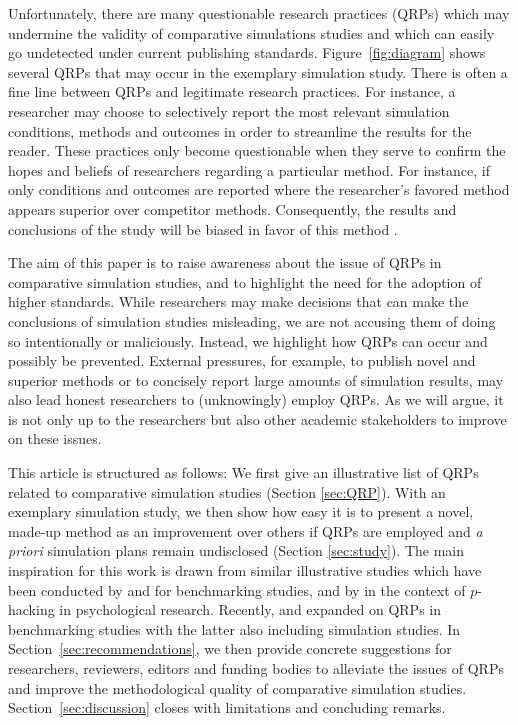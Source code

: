 \documentclass[a4paper, 11pt]{article}
\newcommand{\eg}{{e.g.},~}
\begin{document}
Unfortunately, there are many questionable research practices (QRPs) which may
undermine the validity of comparative simulations studies and which can easily
go undetected under current publishing standards. Figure~\ref{fig:diagram} shows
several QRPs that may occur in the exemplary simulation study. There is often
a fine line between QRPs and legitimate research practices. For instance, a
researcher may choose to selectively report the most relevant simulation
conditions, methods and outcomes in order to streamline the results for the
reader. These practices only become questionable when they serve to confirm
the hopes and beliefs of researchers regarding a particular method. For instance,
if only conditions and outcomes are reported where the researcher's favored
method appears superior over competitor methods. Consequently, the results and
conclusions of the study will be biased in favor of this method \citep{Niessl2021}.

The aim of this paper is to raise awareness about the issue of QRPs in comparative
simulation studies, and to highlight the need for the adoption of higher standards.
While researchers may make decisions that can make the conclusions of simulation
studies misleading, we are not accusing them of doing so intentionally or
maliciously. Instead, we highlight how QRPs can occur and possibly be prevented.
External pressures, for example, to publish novel and superior methods \citep{Boulesteix2015}
or to concisely report large amounts of simulation results, may also lead honest researchers
to (unknowingly) employ QRPs. As we will argue, it is not only up to the researchers but
also other academic stakeholders to improve on these issues.

This article is structured as follows: We first give an illustrative list of QRPs
related to comparative simulation studies (Section \ref{sec:QRP}). With an
exemplary simulation study, we then show how easy it is to present a novel,
made-up method as an improvement over others if QRPs are employed and
\emph{a priori} simulation plans remain undisclosed (Section \ref{sec:study}).
The main inspiration for this work is drawn from similar illustrative studies
which have been conducted by \citet{Yousefi2009} and \citet{Jelizarow2010}
for benchmarking studies, and by \citet{Simmons2011} in the context of
$p$-hacking in psychological
research. Recently, \citet{Niessl2021} and \citet{Ullmann2022} expanded on
QRPs in benchmarking studies with the latter also including simulation studies.
In Section~\ref{sec:recommendations}, we then provide concrete suggestions for
researchers, reviewers, editors and funding bodies to alleviate the issues of
QRPs and improve the methodological quality of comparative simulation studies.
Section~\ref{sec:discussion} closes with limitations and concluding remarks.
\end{document}

